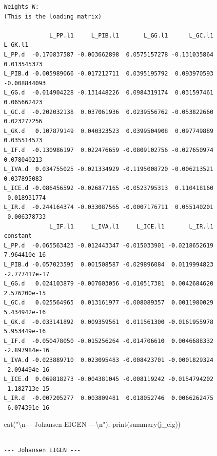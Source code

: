 \documentclass[
  spanish,
  letterpaper,
  DIV=11,
  numbers=noendperiod]{scrartcl}
\newenvironment{Shaded}{\begin{snugshade}}{\end{snugshade}}
\newcommand{\FunctionTok}[1]{\textcolor[rgb]{0.28,0.35,0.67}{#1}}
\newcommand{\NormalTok}[1]{\textcolor[rgb]{0.00,0.23,0.31}{#1}}
\newcommand{\SpecialCharTok}[1]{\textcolor[rgb]{0.37,0.37,0.37}{#1}}
\newcommand{\StringTok}[1]{\textcolor[rgb]{0.13,0.47,0.30}{#1}}
\begin{document}
\begin{verbatim}
Weights W:
(This is the loading matrix)

             L_PP.l1     L_PIB.l1       L_GG.l1      L_GC.l1      L_GK.l1
L_PP.d  -0.170837587 -0.003662898  0.0575157278 -0.131035864  0.013545373
L_PIB.d -0.005989066 -0.017212711  0.0395195792  0.093970593 -0.008844093
L_GG.d  -0.014904228 -0.131448226  0.0984319174  0.031597461  0.065662423
L_GC.d  -0.202032138  0.037061936  0.0239556762 -0.053822660  0.023277256
L_GK.d   0.107879149  0.040323523  0.0399504908  0.097749889  0.035514573
L_IF.d  -0.130986197  0.022476659 -0.0809102756 -0.027650974  0.078040213
L_IVA.d  0.034755025 -0.021334929 -0.1195008720 -0.006213521  0.037895083
L_ICE.d -0.086456592 -0.026877165 -0.0523795313  0.110418160 -0.018931774
L_IR.d  -0.244164374 -0.033087565 -0.0007176711  0.055140201 -0.006378733
             L_IF.l1     L_IVA.l1     L_ICE.l1       L_IR.l1      constant
L_PP.d  -0.065563423 -0.012443347 -0.015033901 -0.0218652619  7.964410e-16
L_PIB.d -0.057023595  0.001508587 -0.029896084  0.0119994823 -2.777417e-17
L_GG.d   0.024103879 -0.007603056 -0.010517381  0.0042684620  2.576200e-15
L_GC.d   0.025564965  0.013161977 -0.008089357  0.0011980029  5.434942e-16
L_GK.d  -0.033141892  0.009359561  0.011561300 -0.0161955978  5.953449e-16
L_IF.d  -0.050478050 -0.015256264 -0.014706610  0.0046688332 -2.897984e-16
L_IVA.d -0.023889710  0.023095483 -0.008423701 -0.0001829324 -2.094494e-16
L_ICE.d  0.069818273 -0.004381045 -0.008119242 -0.0154794202 -1.182713e-15
L_IR.d  -0.007205277  0.003809481  0.018052746  0.0066262475 -6.074391e-16
\end{verbatim}

\begin{Shaded}
\begin{Highlighting}[]
\FunctionTok{cat}\NormalTok{(}\StringTok{"}\SpecialCharTok{\textbackslash{}n}\StringTok{{-}{-}{-} Johansen EIGEN {-}{-}{-}}\SpecialCharTok{\textbackslash{}n}\StringTok{"}\NormalTok{); }\FunctionTok{print}\NormalTok{(}\FunctionTok{summary}\NormalTok{(j\_eig))}
\end{Highlighting}
\end{Shaded}

\begin{verbatim}

--- Johansen EIGEN ---
\end{verbatim}
\end{document}
